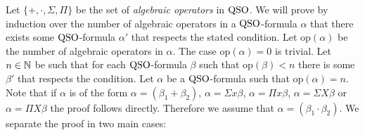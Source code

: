 Let $\{+, \cdot, \Sigma, \Pi\}$ be the set of {\it algebraic operators} in ${\rm QSO}$. We will prove by induction over the number of algebraic operators in a ${\rm QSO}$-formula $\alpha$ that there exists some ${\rm QSO}$-formula $\alpha'$ that respects the stated condition. Let $\text{op}(\alpha)$ be the number of algebraic operators in $\alpha$. The case $\text{op}(\alpha) = 0$ is trivial. Let $n\in\mathbb{N}$ be such that for each ${\rm QSO}$-formula $\beta$ such that $\text{op}(\beta) < n$ there is some $\beta'$ that respects the condition. Let $\alpha$ be a ${\rm QSO}$-formula such that $\text{op}(\alpha) = n$. Note that if $\alpha$ is of the form $\alpha = (\beta_1 + \beta_2)$, $\alpha = \Sigma x \beta$, $\alpha = \Pi x \beta$, $\alpha = \Sigma X \beta$ or $\alpha = \Pi X \beta$ the proof follows directly. Therefore we assume that $\alpha = (\beta_1 \cdot \beta_2)$. We separate the proof in two main cases:
